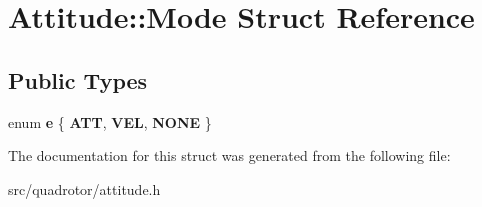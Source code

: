 \hypertarget{structAttitude_1_1Mode}{\section{\-Attitude\-:\-:\-Mode \-Struct \-Reference}
\label{structAttitude_1_1Mode}
}
\subsection*{\-Public \-Types}
\begin{DoxyCompactItemize}
\item 
enum {\bfseries e} \{ {\bfseries \-A\-T\-T}, 
{\bfseries \-V\-E\-L}, 
{\bfseries \-N\-O\-N\-E}
 \}
\end{DoxyCompactItemize}


\-The documentation for this struct was generated from the following file\-:\begin{DoxyCompactItemize}
\item 
src/quadrotor/attitude.\-h\end{DoxyCompactItemize}
